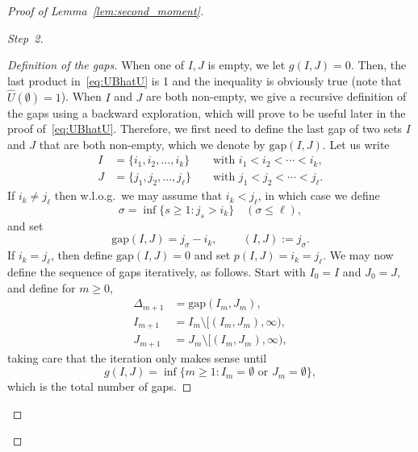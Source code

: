 \documentclass[11pt]{article}
\theoremstyle{definition}
\numberwithin{equation}{section}
\numberwithin{figure}{section}
\numberwithin{table}{section}
\newcommand{\gD}{\Delta}
\newcommand{\gs}{\sigma}
\newcommand{\hU}{\hat U}
\newcommand{\gap}{{\mathrm{gap}}}
\newenvironment{step}[1]{\begin{proof}[#1]}{\let\qed\relax \end{proof}}
\begin{document}
\begin{proof}[Proof of Lemma~\ref{lem:second_moment}]
\begin{step}{Step~2}
\begin{step}{Definition of the gaps}
When one of $I, J$ is empty, we let $g(I, J)=0$. Then, the last product in~\eqref{eq:UBhatU} is 1 and the inequality is obviously true (note that $\hU(\emptyset) = 1$). When $I$ and $J$ are both non-empty, we give a recursive definition of the gaps using a backward exploration, which will prove to be useful later in the proof of~\eqref{eq:UBhatU}. Therefore, we first need to define the last gap of two sets $I$ and $J$ that are both non-empty, which we denote by $\gap(I,J)$. Let us write
\begin{equation}
\begin{aligned}
I &= \{i_1, i_2, \ldots, i_k\} &&\text{ with } i_1 < i_2 < \cdots < i_k,\\
J &= \{j_1, j_2, \ldots, j_\ell\} &&\text{ with } j_1 < j_2 < \cdots < j_\ell.
\end{aligned}
\end{equation}
If $i_k \neq j_\ell$ then w.l.o.g.~we may assume that $i_k < j_\ell$, in which case we define
\begin{equation}
\gs = \inf\{s \geq 1 \colon j_s > i_k\} \quad (\gs \leq \ell),
\end{equation}
and set
\begin{equation}
\gap(I,J) = j_\gs - i_k, \qquad~(I,J) := j_\gs.
\end{equation}
If $i_k = j_\ell$, then define $\gap(I,J) = 0$ and set $p(I,J) = i_k = j_\ell$. We may now define the sequence of gaps iteratively, as follows. Start with $I_0 = I$ and $J_0 = J$, and define for $m \geq 0$,
\begin{equation}\label{eq:defgaps}
\begin{aligned}
\gD_{m+1} &= \gap(I_m, J_m),\\
I_{m+1} &= I_m \setminus [(I_m,J_m),\infty),\\
J_{m+1} &= J_m \setminus [(I_m,J_m),\infty),
\end{aligned}
\end{equation}
taking care that the iteration only makes sense until
\begin{equation}\label{eq:totalgap}
g(I,J) = \inf\{m \geq 1 \colon I_{m} = \emptyset \text{ or } J_{m} = \emptyset\},
\end{equation}
which is the total number of gaps.
\end{step}


\end{step}
\end{proof}
\end{document}
